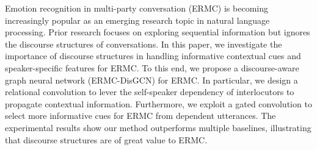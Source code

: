 Emotion recognition in multi-party conversation (ERMC) is becoming increasingly popular as an emerging research topic in natural language processing. Prior research focuses on exploring sequential information but ignores the discourse structures of conversations. In this paper, we investigate the importance of discourse structures in handling informative contextual cues and speaker-specific features for ERMC. To this end, we propose a discourse-aware graph neural network (ERMC-DisGCN) for ERMC. In particular, we design a relational convolution to lever the self-speaker dependency of interlocutors to propagate contextual information. Furthermore, we exploit a gated convolution to select more informative cues for ERMC from dependent utterances. The experimental results show our method outperforms multiple baselines, illustrating that discourse structures are of great value to ERMC.
